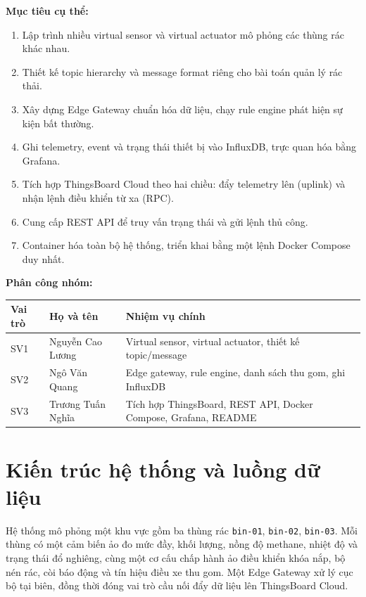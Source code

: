 \documentclass[12pt,a4paper]{article}
\begin{document}
\textbf{Mục tiêu cụ thể:}
\begin{enumerate}[nosep]
    \item Lập trình nhiều virtual sensor và virtual actuator mô phỏng các thùng rác khác nhau.
    \item Thiết kế topic hierarchy và message format riêng cho bài toán quản lý rác thải.
    \item Xây dựng Edge Gateway chuẩn hóa dữ liệu, chạy rule engine phát hiện sự kiện bất thường.
    \item Ghi telemetry, event và trạng thái thiết bị vào InfluxDB, trực quan hóa bằng Grafana.
    \item Tích hợp ThingsBoard Cloud theo hai chiều: đẩy telemetry lên (uplink) và nhận lệnh điều khiển từ xa (RPC).
    \item Cung cấp REST API để truy vấn trạng thái và gửi lệnh thủ công.
    \item Container hóa toàn bộ hệ thống, triển khai bằng một lệnh Docker Compose duy nhất.
\end{enumerate}

\textbf{Phân công nhóm:}
\begin{center}
\begin{tabular}{lll}
\toprule
\textbf{Vai trò} & \textbf{Họ và tên} & \textbf{Nhiệm vụ chính} \\
\midrule
SV1 & Nguyễn Cao Lương & Virtual sensor, virtual actuator, thiết kế topic/message \\
SV2 & Ngô Văn Quang & Edge gateway, rule engine, danh sách thu gom, ghi InfluxDB \\
SV3 & Trương Tuấn Nghĩa & Tích hợp ThingsBoard, REST API, Docker Compose, Grafana, README \\
\bottomrule
\end{tabular}
\end{center}

\section{Kiến trúc hệ thống và luồng dữ liệu}

Hệ thống mô phỏng một khu vực gồm ba thùng rác \texttt{bin-01}, \texttt{bin-02}, \texttt{bin-03}. Mỗi thùng có một cảm biến ảo đo mức đầy, khối lượng, nồng độ methane, nhiệt độ và trạng thái đổ nghiêng, cùng một cơ cấu chấp hành ảo điều khiển khóa nắp, bộ nén rác, còi báo động và tín hiệu điều xe thu gom. Một Edge Gateway xử lý cục bộ tại biên, đồng thời đóng vai trò cầu nối đẩy dữ liệu lên ThingsBoard Cloud.
\end{document}
